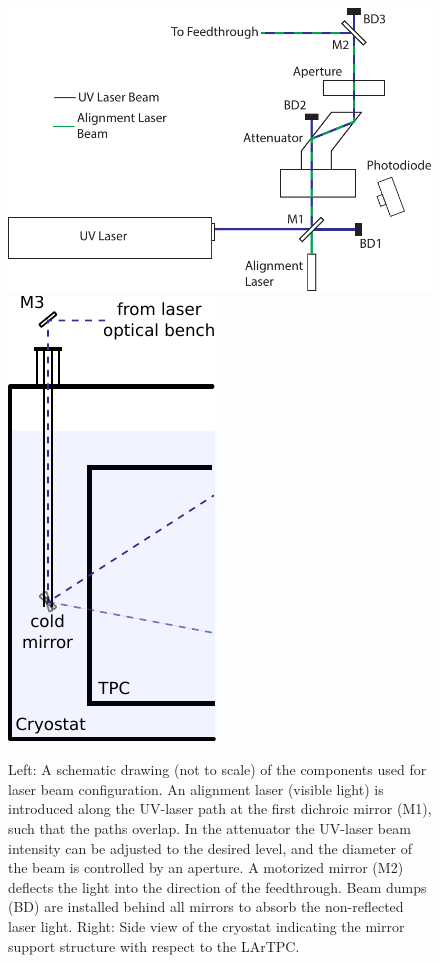 \begin{figure}%
    \centering
    \includegraphics[width=.6\textwidth]{figures/optics.pdf}
    \qquad
    \includegraphics[width=.2\textwidth]{figures/feedthrough2.pdf} 
    \caption{Left: A schematic drawing (not to scale) of the components used for laser beam configuration.  An alignment laser (visible light) is introduced along the UV-laser path at the first dichroic mirror (M1), such that the paths overlap. In the attenuator the UV-laser beam intensity can be adjusted to the desired level, and the diameter of the beam is controlled by an aperture. A motorized mirror (M2) deflects the light into the direction of the feedthrough. Beam dumps (BD) are installed behind all mirrors to absorb the non-reflected laser light. Right: Side view of the cryostat indicating the mirror support structure with respect to the LArTPC.}%
    \label{fig:optics}%
\end{figure}


